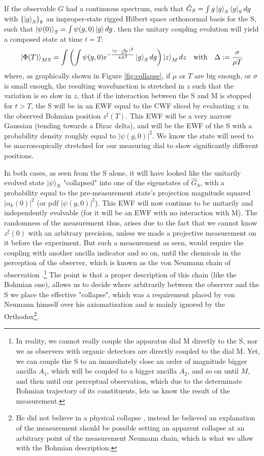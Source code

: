 \documentclass[11pt, a4paper]{article} %
\begin{document}
If the observable $G$ had a continuous spectrum, such that $\hat{G}_S=\int g\ket{g}_S\bra{g}_Sdg$ with $\{\ket{g}_S\}_g$ an improper-state rigged Hilbert space orthonormal basis for the S, such that $\ket{\psi(0)}_S=\int\psi(g,0)\ket{g}dg$, then the unitary coupling evolution will yield a composed state at time $t=T$:
\begin{equation}\label{postM2}
\ket{\Phi(T)}_{MS}=\int\qty(\int\psi(g,0)e^{-\frac{(g-\frac{z}{\mu T})^2}{4\Delta^2}}\ket{g}_S dg)\ket{z}_Mdz\quad \text{with} \quad \Delta:=\frac{\sigma}{\mu T}
\end{equation}
where, as graphically shown in Figure \ref{fig:collapse}, if $\mu$ or $T$ are big enough, or $\sigma$ is small enough, the resulting wavefunction is stretched in $z$ such that the variation is so slow in $z$, that if the interaction between the S and M is stopped for $t>T$, the S will be in an EWF equal to the CWF sliced by evaluating $z$ in the observed Bohmian position $z^\xi(T)$. This EWF will be a very narrow Gaussian (tending towards a Dirac delta), and will be the EWF of the S with a probability density roughly equal to $|\psi(g,0)|^2$. We know the state will need to be macroscopically stretched for our measuring dial to show significantly different positions.

\newpage
In both cases, as seen from the S alone, it will have looked like the unitarily evolved state $\ket{\psi}_S$ "collapsed" into one of the eigenstates of $\hat{G}_S$, with a probability equal to the pre-measurement state's projection magnitude squared $|\alpha_k(0)|^2$ (or pdf $|\psi(g,0)|^2$). This EWF will now continue to be unitarily and independently evolvable (for it will be an EWF with no interaction with M). The randomness of the measurement thus, arises due to the fact that we cannot know $z^\xi(0)$ with an arbitrary precision, unless we made a projective measurement on it before the experiment. But such a measurement as seen, would require the coupling with another ancilla indicator and so on, until the chemicals in the perception of the observer, which is known as the von Neumann chain of observation \cite{vonNeumann}.\footnote{In reality, we cannot really couple the apparatus dial M directly to the S, nor we as observers with organic detectors are directly coupled to the dial M. Yet, we can couple the S to an immediately close an order of magnitude bigger ancilla $A_1$, which will be coupled to a bigger ancilla $A_2$, and so on until $M$, and then until our perceptual observation, which due to the determinate Bohmian trajectory of its constituents, lets us know the result of the measurement.} The point is that a proper description of this chain (like the Bohmian one), allows us to decide where arbitrarily between the observer and the S we place the effective "collapse", which was a requirement placed by von Neumann himself \cite{vonNeumann, NeumannNoCollapse} over his axiomatization and is mainly ignored by the Orthodox\footnote{He did not believe in a physical collapse \cite{NeumannNoCollapse}, instead he believed an explanation of the measurement should be possible setting an apparent collapse at an arbitrary point of the measurement Neumann chain, which is what we allow with the Bohmian description.}.
\end{document}
